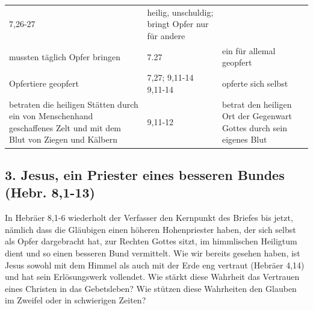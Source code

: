 \documentclass[]{krantz}
\begin{document}
\begin{longtable}[]{@{}lll@{}}
\begin{minipage}[t]{0.19\columnwidth}
7,26-27\strut
\end{minipage} & \begin{minipage}[t]{0.34\columnwidth}\raggedright\strut
heilig, unschuldig; bringt Opfer nur für andere\strut
\end{minipage}\tabularnewline
\begin{minipage}[t]{0.35\columnwidth}\raggedright\strut
mussten täglich Opfer bringen\strut
\end{minipage} & \begin{minipage}[t]{0.19\columnwidth}\raggedright\strut
7.27\strut
\end{minipage} & \begin{minipage}[t]{0.34\columnwidth}\raggedright\strut
ein für allemal geopfert\strut
\end{minipage}\tabularnewline
\begin{minipage}[t]{0.35\columnwidth}\raggedright\strut
Opfertiere geopfert\strut
\end{minipage} & \begin{minipage}[t]{0.19\columnwidth}\raggedright\strut
7,27; 9,11-14 9,11-14\strut
\end{minipage} & \begin{minipage}[t]{0.34\columnwidth}\raggedright\strut
opferte sich selbst\strut
\end{minipage}\tabularnewline
\begin{minipage}[t]{0.35\columnwidth}\raggedright\strut
betraten die heiligen Stätten durch ein von Menschenhand geschaffenes
Zelt und mit dem Blut von Ziegen und Kälbern\strut
\end{minipage} & \begin{minipage}[t]{0.19\columnwidth}\raggedright\strut
9,11-12\strut
\end{minipage} & \begin{minipage}[t]{0.34\columnwidth}\raggedright\strut
betrat den heiligen Ort der Gegenwart Gottes durch sein eigenes
Blut\strut
\end{minipage}\tabularnewline
\bottomrule
\end{longtable}

\subsection{3. Jesus, ein Priester eines besseren Bundes (Hebr.
8,1-13)}\label{jesus-ein-priester-eines-besseren-bundes-hebr.-81-13}

In Hebräer 8,1-6 wiederholt der Verfasser den Kernpunkt des Briefes bis
jetzt, nämlich dass die Gläubigen einen höheren Hohenpriester haben, der
sich selbst als Opfer dargebracht hat, zur Rechten Gottes sitzt, im
himmlischen Heiligtum dient und so einen besseren Bund vermittelt. Wie
wir bereits gesehen haben, ist Jesus sowohl mit dem Himmel als auch mit
der Erde eng vertraut (Hebräer 4,14) und hat sein Erlösungswerk
vollendet. Wie stärkt diese Wahrheit das Vertrauen eines Christen in das
Gebetsleben? Wie stützen diese Wahrheiten den Glauben im Zweifel oder in
schwierigen Zeiten?
\end{document}

